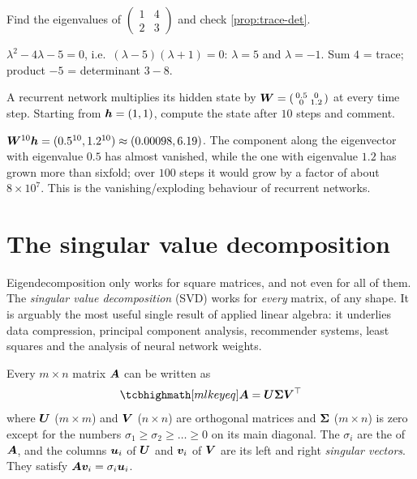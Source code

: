 \begin{exercise}
Find the eigenvalues of $\left(\begin{smallmatrix} 1 & 4\\ 2 &
3\end{smallmatrix}\right)$ and check \cref{prop:trace-det}.
\end{exercise}
\begin{solution}
$\lambda^2 - 4\lambda - 5 = 0$, i.e.\ $(\lambda - 5)(\lambda + 1) = 0$:
$\lambda = 5$ and $\lambda = -1$. Sum $4$ = trace; product $-5$ = determinant
$3 - 8$.
\end{solution}

\begin{exercise}
A recurrent network multiplies its hidden state by
$\bm{W} = \left(\begin{smallmatrix} 0.5 & 0\\ 0 & 1.2\end{smallmatrix}\right)$ at
every time step. Starting from $\bm{h} = (1, 1)$, compute the state after $10$
steps and comment.
\end{exercise}
\begin{solution}
$\bm{W}^{10}\bm{h} = (0.5^{10}, 1.2^{10}) \approx (0.00098, 6.19)$. The component
along the eigenvector with eigenvalue $0.5$ has almost vanished, while the
one with eigenvalue $1.2$ has grown more than sixfold; over $100$ steps it
would grow by a factor of about $8\times10^7$. This is the vanishing/exploding
behaviour of recurrent networks.
\end{solution}

\section{The singular value decomposition}\label{sec:svd}

\begin{motivation}
Eigendecomposition only works for square matrices, and not even for all of
them. The \emph{singular value decomposition} (SVD) works for \emph{every}
matrix, of any shape. It is arguably the most useful single result of applied
linear algebra: it underlies data compression, principal component analysis,
recommender systems, least squares and the analysis of neural network weights.
\end{motivation}

\begin{theorem}\label{thm:svd}
Every $m\times n$ matrix $\bm{A}$ can be written as
\[
  \keyeq{\mA = \mU\mSigma\mV^\top}
\]
where $\bm{U}$ ($m\times m$) and $\bm{V}$ ($n\times n$) are orthogonal matrices and
$\bm{\Sigma}$ ($m\times n$) is zero except for the numbers
$\sigma_1 \ge \sigma_2 \ge \dots \ge 0$ on its main diagonal. The $\sigma_i$
are the  of $\bm{A}$, and the columns
$\bm{u}_i$ of $\bm{U}$ and $\bm{v}_i$ of $\bm{V}$ are its left and right \emph{singular
vectors}. They satisfy $\bm{A}\bm{v}_i = \sigma_i\bm{u}_i$.
\end{theorem}

